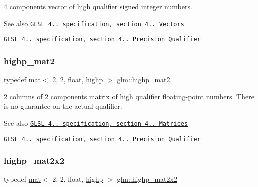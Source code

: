 4 components vector of high qualifier signed integer numbers.

\begin{DoxySeeAlso}{See also}
\href{http://www.opengl.org/registry/doc/GLSLangSpec.4.20.8.pdf}{\tt G\+L\+SL 4.. specification, section 4.. Vectors} 

\href{http://www.opengl.org/registry/doc/GLSLangSpec.4.20.8.pdf}{\tt G\+L\+SL 4.. specification, section 4.. Precision Qualifier} 
\end{DoxySeeAlso}
\mbox{\label{group__core__precision_gae7066dac53a008363d6faeabf46ccb03}} 
\subsubsection{\texorpdfstring{highp\+\_\+mat2}{highp\_mat2}}
{\footnotesize\ttfamily typedef \mbox{\hyperlink{structglm_1_1mat}{mat}}$<$ 2, 2, float, \mbox{\hyperlink{namespaceglm_a36ed105b07c7746804d7fdc7cc90ff25ac6f7eab42eacbb10d59a58e95e362074}{highp}} $>$ \mbox{\hyperlink{group__core__precision_gae7066dac53a008363d6faeabf46ccb03}{glm\+::highp\+\_\+mat2}}}

2 columns of 2 components matrix of high qualifier floating-\/point numbers. There is no guarantee on the actual qualifier.

\begin{DoxySeeAlso}{See also}
\href{http://www.opengl.org/registry/doc/GLSLangSpec.4.20.8.pdf}{\tt G\+L\+SL 4.. specification, section 4.. Matrices} 

\href{http://www.opengl.org/registry/doc/GLSLangSpec.4.20.8.pdf}{\tt G\+L\+SL 4.. specification, section 4.. Precision Qualifier} 
\end{DoxySeeAlso}
\mbox{\label{group__core__precision_gacdb012ddb9e783ed51b0ee009bf0d822}} 
\subsubsection{\texorpdfstring{highp\+\_\+mat2x2}{highp\_mat2x2}}
{\footnotesize\ttfamily typedef \mbox{\hyperlink{structglm_1_1mat}{mat}}$<$ 2, 2, float, \mbox{\hyperlink{namespaceglm_a36ed105b07c7746804d7fdc7cc90ff25ac6f7eab42eacbb10d59a58e95e362074}{highp}} $>$ \mbox{\hyperlink{group__core__precision_gacdb012ddb9e783ed51b0ee009bf0d822}{glm\+::highp\+\_\+mat2x2}}}

